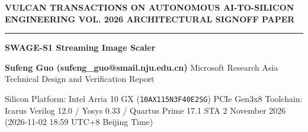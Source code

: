 \documentclass[11pt,a4paper]{article}
\begin{document}
{\scriptsize\sffamily\textcolor{vulcan}{\textbf{VULCAN TRANSACTIONS ON AUTONOMOUS AI-TO-SILICON ENGINEERING \hfill VOL. 2026 \textperiodcentered{} ARCHITECTURAL SIGNOFF PAPER}}\par}

\vspace{1pt}\textcolor{vulcan}{\rule{\textwidth}{1.2pt}}\vspace{4pt}

\begin{center}

{\sffamily\LARGE\bfseries SWAGE-S1 Streaming Image Scaler\par}\vspace{3pt}

{\small\sffamily\textbf{Sufeng Guo (\allowbreak{}sufeng\_\allowbreak{}guo@smail.nju.edu.cn)\allowbreak{}} \textperiodcentered{} Microsoft Research Asia \textperiodcentered{} Technical Design and Verification Report\par}\vspace{1pt}

{\scriptsize\sffamily\textcolor{black!75}{Silicon Platform: Intel Arria 10 GX (\texttt{10AX115N3F40E2SG}) PCIe Gen3x8 \textperiodcentered{} Toolchain: Icarus Verilog 12.0 / Yosys 0.33 / Quartus Prime 17.1 STA \textperiodcentered{} 2 November 2026 (\allowbreak{}2026-11-02 18:59 UTC+\allowbreak{}8 Beijing Time)\allowbreak{}}\par}

\end{center}\vspace{2pt}
\end{document}
